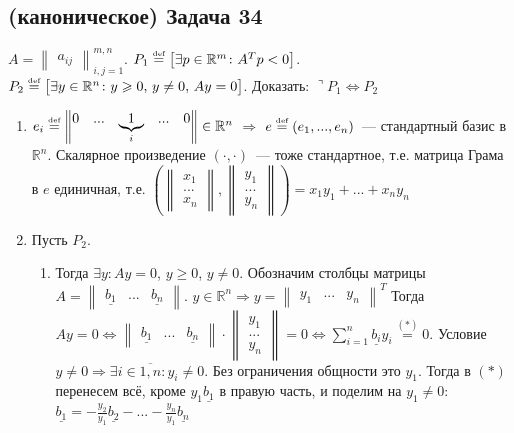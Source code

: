 \documentclass[a4paper]{article}
\def\eqdef{\overset{\mbox{\tiny def}}{=}}
\newcommand{\RR}{\mathbb{R}}
\begin{document}
\subsection*{(каноническое) Задача 34}
$A=\begin{Vmatrix}
a_{ij}
\end{Vmatrix}_{i,j=1}^{m,n}$. $P_1\eqdef\big[\exists p\in\RR^m\colon A^Tp<0\big]$. $P_2\eqdef\big[\exists y\in\RR^n\colon y\geqslant 0,\,y\neq 0,\,Ay=0\big]$. Доказать: $\urcorner P_1\Leftrightarrow P_2$\begin{enumerate}
\item $e_i\eqdef \begin{Vmatrix}
0 & ... & \underbrace{1}_{i} & ... & 0
\end{Vmatrix}\in\RR^n$ $\Rightarrow$ $e\eqdef(e_1,...,e_n)$~--- стандартный базис в $\RR^n$. Скалярное произведение $(\cdot,\cdot)$~--- тоже стандартное, т.е. матрица Грама в $e$ единичная, т.е. $(\begin{Vmatrix}
x_1\\
...\\
x_n
\end{Vmatrix},
\begin{Vmatrix}
y_1\\
...\\
y_n
\end{Vmatrix})=x_1y_1+...+x_ny_n$
\item Пусть $P_2$. \begin{enumerate}
\item Тогда $\exists y\colon Ay=0$, $y\geqslant 0$, $y\neq 0$. Обозначим столбцы матрицы $A=\begin{Vmatrix}
\underline{b_1} & ... & \underline{b_n}
\end{Vmatrix}$. $y\in\RR^n\Rightarrow y=\begin{Vmatrix}
y_1 & ... & y_n
\end{Vmatrix}^T$ Тогда $Ay=0\Leftrightarrow\begin{Vmatrix}
\underline{b_1} & ... & \underline{b_n}
\end{Vmatrix}\cdot
\begin{Vmatrix}
y_1\\
...\\
y_n
\end{Vmatrix}
=0\Leftrightarrow \sum\limits_{i=1}^n \underline{b_i}y_i\overset{(*)}{=}0$. Условие $y\neq 0\Rightarrow\exists i\in\overline{1,n}\colon y_i\neq 0$. Без ограничения общности это $y_1$. Тогда в $(*)$ перенесем всё, кроме $y_1\underline{b_1}$ в правую часть, и поделим на $y_1\neq 0$: $\underline{b_1}=-\frac{y_2}{y_1}\underline{b_2}-...-\frac{y_n}{y_1}\underline{b_n}$

\end{enumerate}
\end{enumerate}
\end{document}
